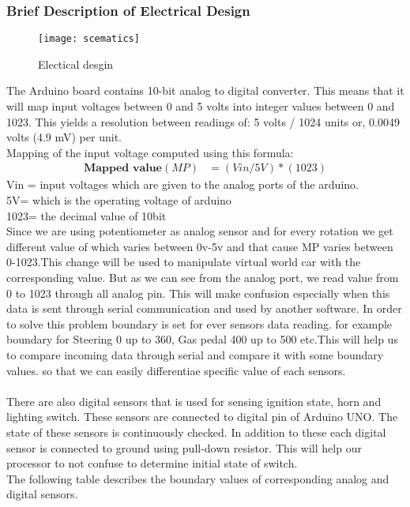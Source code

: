 \documentclass[12pt,a4paper]{article}
\begin{document}
\begin{center}
\begin{center}
\begin{center}
\subsubsection{Brief Description of Electrical Design}
\begin{figure}
	\centering
	\texttt{[image: scematics]}
	\caption{Electical desgin}
	\label{fig:scematics}
\end{figure}
The Arduino board contains 10-bit analog to digital converter. This means that it will map input voltages between 0 and 5 volts into integer values between 0 and 1023. This yields a resolution between readings of: 5 volts / 1024 units or, 0.0049 volts (4.9 mV) per unit. 
\\
Mapping of the input voltage computed using this formula:\\
\begin{align}
\textbf{Mapped value}(MP)&=(Vin/5V)*(1023)
\end{align}
Vin = input voltages which are given to the analog ports of the arduino.\\
5V= which is the operating voltage of arduino \\
1023= the decimal value of 10bit
\\
Since we are using potentiometer as analog sensor and for every rotation we get different value of   which varies between 0v-5v and that cause MP varies between 0-1023.This change will be used to manipulate virtual world car with the corresponding value. But as we can see from the analog port, we read value from 0 to 1023 through all analog pin. This will make confusion especially when this data is sent through serial communication and used by another software. In order to solve this problem boundary is set for ever sensors data reading. for example boundary for Steering 0 up to 360, Gas pedal 400 up to 500 etc.This will help us to compare incoming data through serial and compare it with some boundary values. so that we can easily differentiae specific value of each sensors.\\
\\
There are also digital sensors that is used for sensing ignition state, horn and lighting switch. These sensors are connected to digital pin of Arduino UNO. The state of these sensors is continuously checked. In addition to these each digital sensor is connected to ground using pull-down resistor. This will help our processor to not confuse to determine initial state of switch.
\\
The following table describes the boundary values of corresponding analog and digital sensors.


\end{center}
\end{center}
\end{center}
\end{document}
